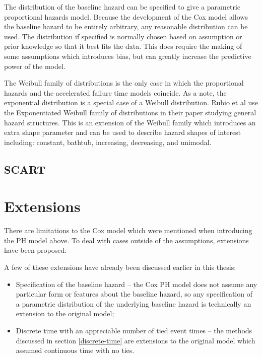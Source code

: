 The distribution of the baseline hazard can be specified to give a parametric proportional hazards model. Because the development of the Cox model allows the baseline hazard to be entirely arbitrary, any reasonable distribution can be used. The distribution if specified is normally chosen based on assumption or prior knowledge so that it best fits the data. This does require the making of some assumptions which introduces bias, but can greatly increase the predictive power of the model.

The Weibull family of distributions is the only case in which the proportional hazards and the accelerated failure time models coincide. As a note, the exponential distribution is a special case of a Weibull distribution. Rubio et al  use the Exponentiated Weibull family of distributions in their paper studying general hazard structures. This is an extension of the Weibull family which introduces an extra shape parameter and can be used to describe hazard shapes of interest including: constant, bathtub, increasing, decreasing, and unimodal.

\subsection{SCART}

\section{Extensions}\label{extensions}

There are limitations to the Cox model which were mentioned when introducing the PH model above. To deal with cases outside of the assumptions, extensions have been proposed. 

A few of these extensions have already been discussed earlier in this thesis:

\begin{itemize}
    \item Specification of the baseline hazard -- the Cox PH model does not assume any particular form or features about the baseline hazard, so any specification of a parametric distribution of the underlying baseline hazard is technically an extension to the original model;
    \item Discrete time with an appreciable number of tied event times -- the methods discussed in section \ref{discrete-time} are extensions to the original model which assumed continuous time with no ties.
\end{itemize}

